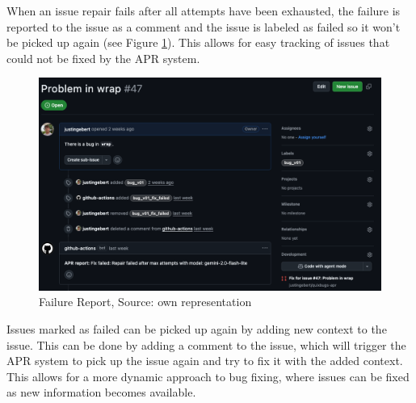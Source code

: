 When an issue repair fails after all attempts have been exhausted, the failure is reported to the issue as a comment and the issue is labeled as failed so it won't be picked up again (see Figure \ref{fig:failure-report}). This allows for easy tracking of issues that could not be fixed by the APR system.

\begin{figure}[H]
    \centering
    \includegraphics[width=1\textwidth]{images/workflow/failure_comment.png}
    \caption{Failure Report, Source: own representation}
    \label{fig:failure-report}
\end{figure}

Issues marked as failed can be picked up again by adding new context to the issue. This can be done by adding a comment to the issue, which will trigger the APR system to pick up the issue again and try to fix it with the added context. This allows for a more dynamic approach to bug fixing, where issues can be fixed as new information becomes available.


